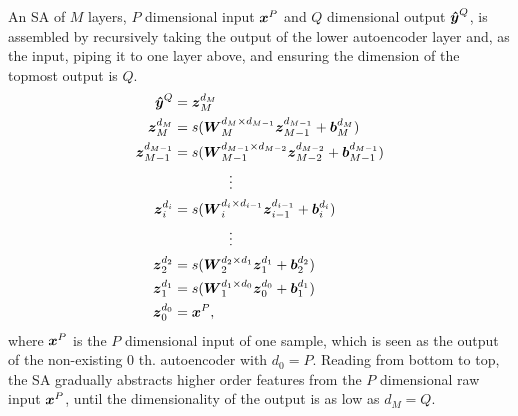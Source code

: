 An SA of $M$ layers, $P$ dimensional input $\boldsymbol{x}^P$ and $Q$ dimensional output $\boldsymbol{\hat{y}}^Q$, is assembled by recursively taking the output of the lower autoencoder layer and, as the input, piping it to one layer above, and ensuring the dimension of the topmost output is $Q$.
\begin{equation} \label{eq:ES}
  \begin{split}
    \boldsymbol{\hat{y}}^Q &= {\boldsymbol{z}_{M}^{d_{M}}} \\
    {\boldsymbol{z}_{M  }^{d_{M  }}} &= s(\boldsymbol{W}_{M  }^{d_{M  } \times d_{M-1}} {\boldsymbol{z}_{M-1}^{d_{M-1}}} + \boldsymbol{b}_{M  }^{d_{M  }}) \\
    {\boldsymbol{z}_{M-1}^{d_{M-1}}} &= s(\boldsymbol{W}_{M-1}^{d_{M-1} \times d_{M-2}} {\boldsymbol{z}_{M-2}^{d_{M-2}}} + \boldsymbol{b}_{M-1}^{d_{M-1}}) \\
    & \quad \quad \quad \quad \vdots \\
    {\boldsymbol{z}_{i  }^{d_{i  }}} &= s(\boldsymbol{W}_{i  }^{d_{i  } \times d_{i-1}} {\boldsymbol{z}_{i-1}^{d_{i-1}}} + \boldsymbol{b}_{i  }^{d_{i  }}) \\
    & \quad \quad \quad \quad \vdots \\
    {\boldsymbol{z}_{2  }^{d_{2  }}} &= s(\boldsymbol{W}_{2  }^{d_{2  } \times d_{1  }} {\boldsymbol{z}_{1  }^{d_{1  }}} + \boldsymbol{b}_{2  }^{d_{2  }}) \\
    {\boldsymbol{z}_{1  }^{d_{1  }}} &= s(\boldsymbol{W}_{1  }^{d_{1  } \times d_{0  }} {\boldsymbol{z}_{0  }^{d_{0  }}} + \boldsymbol{b}_{1  }^{d_{1  }}) \\
    {\boldsymbol{z}_{0  }^{d_{0  }}} &= \boldsymbol{x}^P,
  \end{split}
\end{equation}
where $\boldsymbol{x}^P$ is the $P$ dimensional input of one sample, which is seen as the output of the non-existing $0$ th. autoencoder with $d_0=P$. Reading from bottom to top, the SA gradually abstracts higher order features from the $P$ dimensional raw input $\boldsymbol{x}^P$, until the dimensionality of the output is as low as $d_M=Q$.

